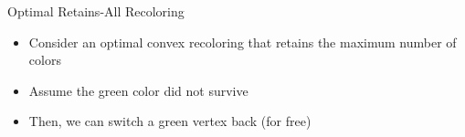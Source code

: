 \begin{frame}{Optimal Retains-All Recoloring}
\begin{itemize}

\item
Consider an optimal convex recoloring that retains the maximum number of colors

\pause\item
Assume the green color did not survive

\pause\item
Then, we can switch a green vertex back (for free)


\end{itemize}

\end{frame}